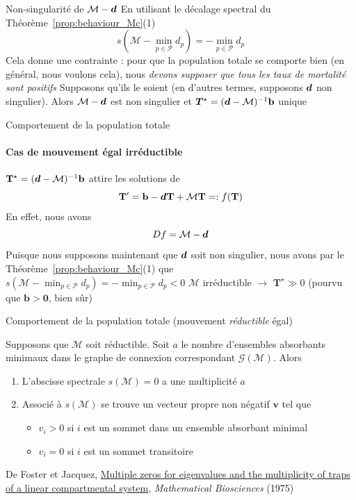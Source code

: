 \documentclass[aspectratio=169]{beamer}\usepackage[]{graphicx}\usepackage[]{xcolor}
\begin{document}
\begin{frame}{Non-singularité de $\mathcal{M}-\bm{d}$}
En utilisant le décalage spectral du Théorème~\ref{prop:behaviour_Mc}{(1)}
\[
s\left(\mathcal{M}-\min_{p\in\mathcal{P}}d_p\right)=-\min_{p\in\mathcal{P}}d_p
\]
Cela donne une contrainte : pour que la population totale se comporte bien (en général, nous voulons cela), nous \emph{devons supposer que tous les taux de mortalité sont positifs}
\vfill
Supposons qu'ils le soient (en d'autres termes, supposons $\bm{d}$ non singulier). Alors $\mathcal{M}-\bm{d}$ est non singulier et $\bm{T}^\star=(\bm{d}-\mathcal{M})^{-1}\mathbf{b}$ unique
\end{frame}


\begin{frame}{Comportement de la population totale}
\framesubtitle{Cas de mouvement égal irréductible}
$\mathbf{T}^\star=(\bm{d}-\mathcal{M})^{-1}\mathbf{b}$ attire les solutions de
$$
\mathbf{T}'=\mathbf{b}-\bm{d}\mathbf{T}+\mathcal{M}\mathbf{T}=:f(\mathbf{T})
$$
\vfill
En effet, nous avons
$$
Df=\mathcal{M}-\bm{d}
$$
\vfill
Puisque nous supposons maintenant que $\bm{d}$ soit non singulier, nous avons par le Théorème~\ref{prop:behaviour_Mc}{(1)} que $s(\mathcal{M}-\min_{p\in\mathcal{P}}d_p)=-\min_{p\in\mathcal{P}}d_p<0$
\vfill
$\mathcal{M}$ irréductible $\rightarrow$ $\mathbf{T}^\star\gg 0$ (pourvu que $\mathbf{b}>\mathbf{0}$, bien sûr)
\end{frame}


\begin{frame}{Comportement de la population totale (mouvement \emph{réductible} égal)}
\begin{theorem}
Supposons que $\mathcal{M}$ soit réductible. Soit $a$ le nombre d'ensembles absorbants minimaux dans le graphe de connexion correspondant $\mathcal{G}(\mathcal{M})$. Alors
\begin{enumerate}
	\item L'abscisse spectrale $s(\mathcal{M})=0$ a une multiplicité $a$
	\item Associé à $s(\mathcal{M})$ se trouve un vecteur propre non négatif $\mathbf{v}$ tel que
	\begin{itemize}
		\item $v_i>0$ si $i$ est un sommet dans un ensemble absorbant minimal
		\item $v_i=0$ si $i$ est un sommet transitoire
	\end{itemize}
\end{enumerate}
\end{theorem}

\vfill
De Foster et Jacquez, \href{https://doi.org/10.1016/0025-5564(75)90096-6}{Multiple zeros for eigenvalues and the multiplicity of traps of a linear compartmental system}, \emph{Mathematical Biosciences} (1975) \nocite{foster1975multiple}
\end{frame}
\end{document}
